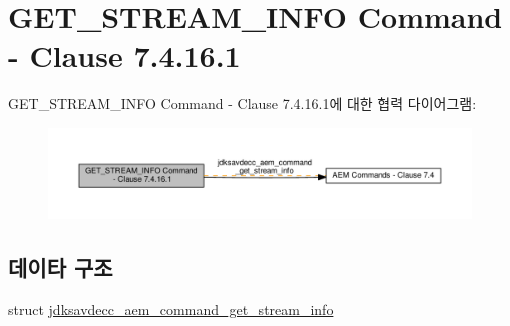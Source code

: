 \hypertarget{group__command__get__stream__info}{}\section{G\+E\+T\+\_\+\+S\+T\+R\+E\+A\+M\+\_\+\+I\+N\+FO Command -\/ Clause 7.4.16.1}
\label{group__command__get__stream__info}
G\+E\+T\+\_\+\+S\+T\+R\+E\+A\+M\+\_\+\+I\+N\+FO Command -\/ Clause 7.4.16.1에 대한 협력 다이어그램\+:
\nopagebreak
\begin{figure}[H]
\begin{center}
\leavevmode
\includegraphics[width=350pt]{group__command__get__stream__info}
\end{center}
\end{figure}
\subsection*{데이타 구조}
\begin{DoxyCompactItemize}
\item 
struct \hyperlink{structjdksavdecc__aem__command__get__stream__info}{jdksavdecc\+\_\+aem\+\_\+command\+\_\+get\+\_\+stream\+\_\+info}
\end{DoxyCompactItemize}
